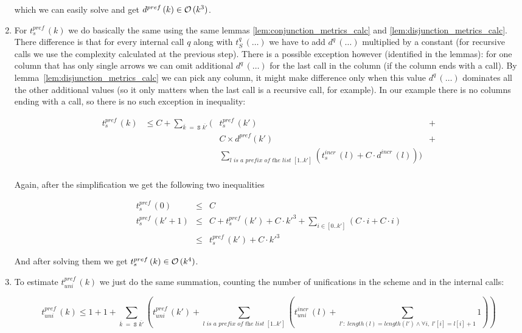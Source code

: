 \begin{enumerate}
which we can easily solve and get $d^{pref}\,(k) \in \mathcal{O}\,(k^3)$.

\item For $t_s^{pref}\,(k)$ we do basically the same using the same lemmas \ref{lem:conjunction_metrics_calc} and \ref{lem:disjunction_metrics_calc}. There difference is that for every internal call $q$ along with $t_S^q\,(\dots)$ we have to add $d^q\,(\dots)$
  multiplied by a constant (for recursive calls we use the complexity calculated at the previous step). There is a possible exception however (identified in the lemmas): for one column that has only single arrows we can omit additional $d^q\,(\dots)$ for the last call in the column (if the column ends with a call).
  By lemma~\ref{lem:disjunction_metrics_calc} we can pick any column, it might make difference only when this value $d^q\,(\dots)$ dominates all the other additional values (so it only
  matters when the last call is a recursive call, for example). In our example there is no columns ending with a call, so there is no such exception in inequality:

  \[
\begin{array}{rclc}
  t_s^{pref}\,(k) & \le C + \sum_{\overline{k} \;=\; \texttt{S $\overline{k'}$}} (& t_s^{pref}\,(k') & + \\
                &     & C \times d^{pref}(k') & + \\
                &     & \sum_{\textit{$l$ is a prefix of the list $[1..k']$}} (t_s^{incr}\,(l) + C \cdot d^{incr}\,(l))) & \\
\end{array}
\]

Again, after the simplification we get the following two inequalities

\[ \begin{array}{rcl}
t_s^{pref}\,(0) &\le& C \\
t_s^{pref}\,(k' + 1) &\le& C + t_s^{pref}\,(k') + C \cdot k'^3 + \sum_{i \in [0..k']} (C \cdot i + C \cdot i) \\
                  &\le& t_s^{pref}\,(k') + C \cdot k'^3 
\end{array} \]

And after solving them we get $t_s^{pref}\,(k) \in \mathcal{O}\,(k^4)$.

\item To estimate $t_{uni}^{pref}\,(k)$ we just do the same summation, counting the number of unifications in the scheme and in the internal calls:

  \[
    t_{uni}^{pref}\,(k) \le 1 + 1 + \sum_{\overline{k} \;=\; \texttt{S $\overline{k'}$}} (t_{uni}^{pref}\,(k') + \sum_{\textit{$l$ is a prefix of the list $[1..k']$}} (t_{uni}^{incr}\,(l) + \sum_{l': \; length(l) = length(l') \land \forall i, \; l'[i] = l[i] + 1} 1))
    \]


\end{enumerate}
